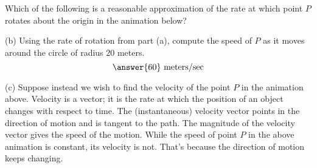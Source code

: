 \documentclass{ximera}
\begin{document}

\begin{question}   \label{Qdfg4bk:Cross}
Which of the following is a reasonable approximation of the rate at which point $P$ rotates about the origin in the animation below?
\begin{multipleChoice}  
\end{multipleChoice}  
\end{question}


(b) Using the rate of rotation from part (a), compute the speed of $P$ as it moves around the circle of radius $20$ meters. 
\[
   \answer{60} \text{ meters/sec}
\]


 
\begin{onlineOnly}
    \begin{center}
\end{center}
\end{onlineOnly}


(c) Suppose instead we wish to find the velocity of the point $P$ in the animation above. Velocity is a vector; it is the rate at which the position of an object changes with respect to time. The (instantaneous) velocity vector points in the direction of motion and is  tangent to the path. The magnitude of the velocity vector gives the speed of the motion. While the speed of point $P$ in the above animation is constant, its velocity is not. That's because the direction of motion keeps changing.
\end{document}
